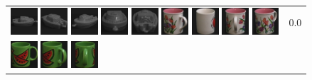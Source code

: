 {\begin{figure}[p]
\begin{tabular}{m{11cm} | m{3cm} |}
\includegraphics[width=1cm]{coil/beeld-25.eps}
\includegraphics[width=1cm]{coil/beeld-28.eps}
\includegraphics[width=1cm]{coil/beeld-27.eps}
\includegraphics[width=1cm]{coil/beeld-26.eps}
\includegraphics[width=1cm]{coil/beeld-29.eps}
\includegraphics[width=1cm]{coil/beeld-10.eps}
\includegraphics[width=1cm]{coil/beeld-38.eps}
\includegraphics[width=1cm]{coil/beeld-11.eps}
\includegraphics[width=1cm]{coil/beeld-9.eps}
& {\scriptsize 0.0}
\\
\includegraphics[width=1cm]{coil/beeld-30.eps}
\includegraphics[width=1cm]{coil/beeld-34.eps}
\includegraphics[width=1cm]{coil/beeld-35.eps}

\end{tabular}
\end{figure}}
